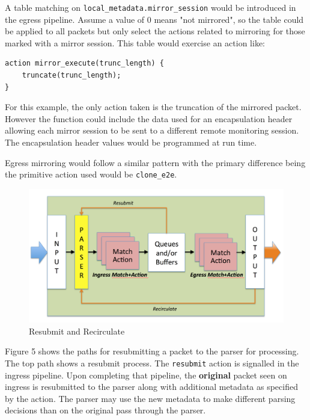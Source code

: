 \documentclass[12pt]{article}
\begin{document}
A table matching on \texttt{local_metadata.mirror_session} would be introduced
in the egress pipeline. Assume a value of 0 means "not mirrored", so the table
could be applied to all packets but only select the actions related to mirroring
for those marked with a mirror session. This table would exercise an action
like:

\begin{lstlisting}[keywords={},frame=single,escapechar=\@]
action mirror_execute(trunc_length) {
    truncate(trunc_length);
}
\end{lstlisting}


For this example, the only action taken is the truncation of the mirrored
packet. However the function could include the data used for an encapsulation
header allowing each mirror session to be sent to a different remote monitoring
session. The encapsulation header values would be programmed at run time.

Egress mirroring would follow a similar pattern with the primary difference
being the primitive action used would be \texttt{clone_e2e}.



\begin{figure}[h!]
    \centering
    \includegraphics[width=\textwidth]{figures/recirculate.png}
    \caption{Resubmit and Recirculate}
    \label{fig:recirc}
\end{figure}

Figure 5 shows the paths for resubmitting a packet to the parser for
processing.  The top path shows a resubmit process.  The
\texttt{resubmit} action is signalled in the ingress pipeline. Upon
completing that pipeline, the \textbf{original} packet seen on ingress
is resubmitted to the parser along with additional metadata as
specified by the action.  The parser may use the new metadata to make
different parsing decisions than on the original pass through the
parser.
\end{document}
